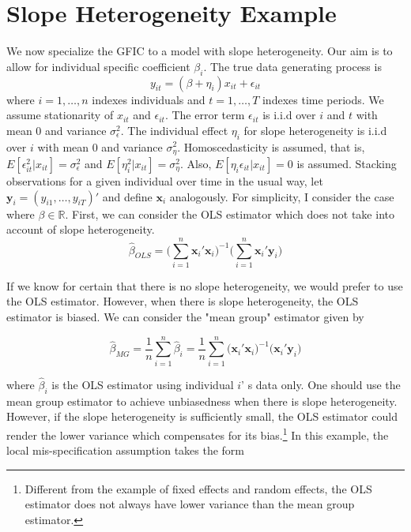 \section{Slope Heterogeneity Example}
\label{sec:slopeHet}
We now specialize the GFIC to a model with slope heterogeneity. Our aim is to allow for individual specific coefficient $\beta_i$. The true data generating process is 
	\begin{equation}
				y_{it} = (\beta+\eta_i) x_{it} + \epsilon_{it}
	\end{equation}
where $i = 1, \hdots, n$ indexes individuals and $t=1, \hdots, T$  indexes time periods. We assume stationarity of $x_{it}$ and $\epsilon_{it}$. The error term $\epsilon_{it}$ is i.i.d over $i$ and $t$ with mean 0 and variance $\sigma_\epsilon^2$. The individual effect $\eta_i$ for slope heterogeneity is i.i.d over $i$ with mean 0 and variance $\sigma_\eta^2$. Homoscedasticity is assumed, that is, $E[\epsilon_{it}^2 | x_{it}] = \sigma_\epsilon^2$ and $E[\eta_i^2 | x_{it}] = \sigma_\eta^2$. Also, $E[\eta_i \epsilon_{it} | x_{it}] = 0$ is assumed. Stacking observations for a given individual over time in the usual way, let $\mathbf{y}_i = (y_{i1}, \ldots, y_{iT})'$ and define $\mathbf{x}_i$ analogously. For simplicity, I consider the case where $\beta \in \mathbb{R}$. First, we can consider the OLS estimator which does not take into account of slope heterogeneity. 
	\begin{equation}
\widehat{\beta}_{OLS} = \bigg(\sum_{i=1}^{n} \mathbf{x}_i'  \mathbf{x}_i\bigg)^{-1}\bigg(\sum_{i=1}^{n} \mathbf{x}_i' \mathbf{y}_i   \bigg)	
	\end{equation}
	
If we know for certain that there is no slope heterogeneity, we would prefer to use the OLS estimator. However, when there is slope heterogeneity, the OLS estimator is biased. We can consider the "mean group" estimator given by 


	\begin{equation}
\widehat{\beta}_{MG}  = \frac{1}{n}\sum_{i=1}^n \widehat{\beta}_i 
= \frac{1}{n} \sum_{i=1}^n \bigg( \mathbf{x}_i'  \mathbf{x}_i\bigg)^{-1}\bigg( \mathbf{x}_i'  \mathbf{y}_i   \bigg)
\end{equation}

where $\widehat{\beta}_i$ is the OLS estimator using individual $i$'
s data only. One should use the mean group estimator to achieve unbiasedness when there is slope heterogeneity. However, if the slope heterogeneity is sufficiently small, the OLS estimator could render the lower variance which compensates for its bias.\footnote{Different from the example of fixed effects and random effects, the OLS estimator does not always have lower variance than the mean group estimator.} In this example, the local mis-specification assumption takes the form  

